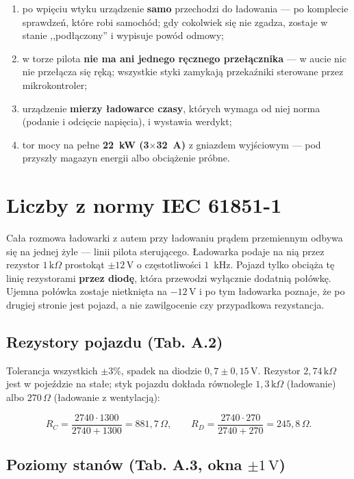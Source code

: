\documentclass[a4paper,11pt]{article}
\newcommand{\ohm}{\,\Omega}
\newcommand{\kohm}{\,\mathrm{k}\Omega}
\newcommand{\volt}{\,\mathrm{V}}
\begin{document}
\begin{enumerate}
\item po wpięciu wtyku urządzenie \textbf{samo} przechodzi do ładowania --- po
      komplecie sprawdzeń, które robi samochód; gdy cokolwiek się nie zgadza,
      zostaje w stanie ,,podłączony'' i wypisuje powód odmowy;
\item w torze pilota \textbf{nie ma ani jednego ręcznego przełącznika} --- w aucie
      nic nie przełącza się ręką; wszystkie styki zamykają przekaźniki sterowane
      przez mikrokontroler;
\item urządzenie \textbf{mierzy ładowarce czasy}, których wymaga od niej norma
      (podanie i odcięcie napięcia), i wystawia werdykt;
\item tor mocy na pełne \textbf{22~kW (3$\times$32~A)} z gniazdem wyjściowym ---
      pod przyszły magazyn energii albo obciążenie próbne.
\end{enumerate}

\section{Liczby z normy IEC 61851-1}

Cała rozmowa ładowarki z autem przy ładowaniu prądem przemiennym odbywa się na
jednej żyle --- linii pilota sterującego. Ładowarka podaje na nią przez rezystor
$1\kohm$ prostokąt $\pm 12\volt$ o częstotliwości $1$~kHz. Pojazd tylko obciąża tę
linię rezystorami \textbf{przez diodę}, która przewodzi wyłącznie dodatnią połówkę.
Ujemna połówka zostaje nietknięta na $-12\volt$ i po tym ładowarka poznaje, że po
drugiej stronie jest pojazd, a nie zawilgocenie czy przypadkowa rezystancja.

\subsection{Rezystory pojazdu (Tab. A.2)}

Tolerancja wszystkich $\pm 3\%$, spadek na diodzie $0{,}7 \pm 0{,}15\volt$.
Rezystor $2{,}74\kohm$ jest w pojeździe na stałe; styk pojazdu dokłada równolegle
$1{,}3\kohm$ (ładowanie) albo $270\ohm$ (ładowanie z wentylacją):

\[
R_{C}=\frac{2740\cdot 1300}{2740+1300}=881{,}7\ohm,
\qquad
R_{D}=\frac{2740\cdot 270}{2740+270}=245{,}8\ohm .
\]

\subsection{Poziomy stanów (Tab. A.3, okna \texorpdfstring{$\pm 1\volt$}{+/-1 V})}
\end{document}
